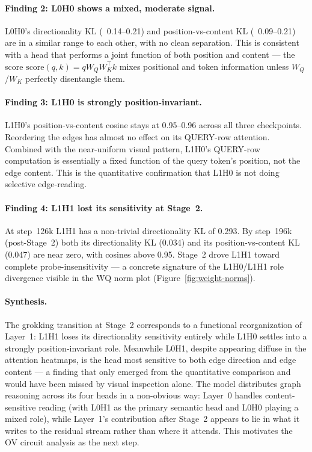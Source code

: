 \documentclass[11pt, a4paper]{article}
\begin{document}
\paragraph{Finding 2: L0H0 shows a mixed, moderate signal.}
L0H0's directionality KL (~0.14--0.21) and position-vs-content KL (~0.09--0.21)
are in a similar range to each other, with no clean separation.  This is
consistent with a head that performs a joint function of both position and content
--- the score $\text{score}(q, k) = q W_Q W_K^\top k$ mixes positional and token
information unless $W_Q$/$W_K$ perfectly disentangle them.

\paragraph{Finding 3: L1H0 is strongly position-invariant.}
L1H0's position-vs-content cosine stays at 0.95--0.96 across all three
checkpoints.  Reordering the edges has almost no effect on its QUERY-row
attention.  Combined with the near-uniform visual pattern, L1H0's QUERY-row
computation is essentially a fixed function of the query token's position, not
the edge content.  This is the quantitative confirmation that L1H0 is not doing
selective edge-reading.

\paragraph{Finding 4: L1H1 lost its sensitivity at Stage~2.}
At step~126k L1H1 has a non-trivial directionality KL of 0.293.  By step~196k
(post-Stage~2) both its directionality KL (0.034) and its position-vs-content KL
(0.047) are near zero, with cosines above 0.95.  Stage~2 drove L1H1 toward
complete probe-insensitivity --- a concrete signature of the L1H0/L1H1 role
divergence visible in the WQ norm plot (Figure~\ref{fig:weight-norms}).

\paragraph{Synthesis.}
The grokking transition at Stage~2 corresponds to a functional reorganization of
Layer~1: L1H1 loses its directionality sensitivity entirely while L1H0 settles
into a strongly position-invariant role.  Meanwhile L0H1, despite appearing
diffuse in the attention heatmaps, is the head most sensitive to both edge
direction and edge content --- a finding that only emerged from the quantitative
comparison and would have been missed by visual inspection alone.  The model
distributes graph reasoning across its four heads in a non-obvious way: Layer~0
handles content-sensitive reading (with L0H1 as the primary semantic head and
L0H0 playing a mixed role), while Layer~1's contribution after Stage~2 appears
to lie in what it writes to the residual stream rather than where it attends.
This motivates the OV circuit analysis as the next step.
\end{document}
